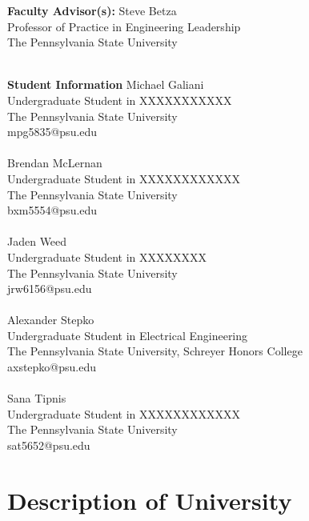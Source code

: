 \documentclass{article}
\begin{document}
\noindent\textbf{Faculty Advisor(s):}\newline
Steve Betza\\
Professor of Practice in Engineering Leadership\\
The Pennsylvania State University
\\~\\
\begin{multicols}{2}
\noindent\textbf{Student Information}\newline
Michael Galiani\\
Undergraduate Student in XXXXXXXXXXX\\
The Pennsylvania State University\\
mpg5835@psu.edu
\\~\\
Brendan McLernan\\
Undergraduate Student in XXXXXXXXXXXX\\
The Pennsylvania State University\\
bxm5554@psu.edu
\\~\\
Jaden Weed\\
Undergraduate Student in XXXXXXXX\\
The Pennsylvania State University\\
jrw6156@psu.edu\columnbreak
\\~\\
Alexander Stepko\\
Undergraduate Student in Electrical Engineering\\
The Pennsylvania State University, Schreyer Honors College\\
axstepko@psu.edu
\\~\\
Sana Tipnis\\
Undergraduate Student in XXXXXXXXXXXX\\
The Pennsylvania State University\\
sat5652@psu.edu
\end{multicols}
\newpage


\section{Description of University}\label{apxB}
\blindtext[3]
\end{document}
